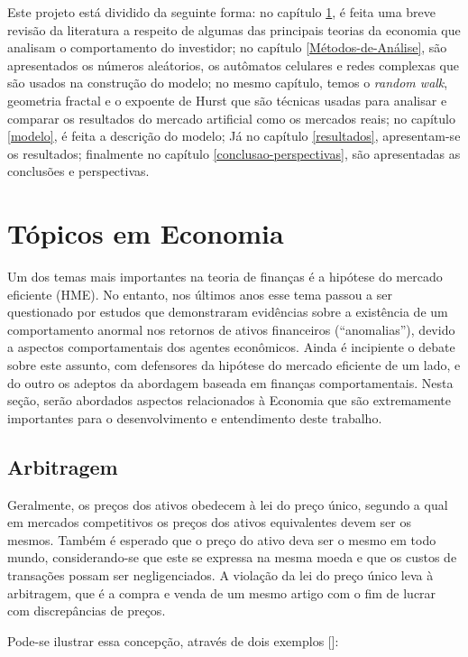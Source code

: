\documentclass[brazil,ruledheader]{abnt}
\renewcommand{\cite}[1]{[\citeonline{#1}]}
\begin{document}
Este projeto está dividido da seguinte forma: no capítulo
\ref{topicos-em-economia}, é feita uma breve revisão da literatura a respeito de
algumas das principais teorias da economia que analisam o comportamento do
investidor; no capítulo \ref{Métodos-de-Análise}, são apresentados os números
aleátorios, os autômatos celulares e redes complexas que são usados na
construção do modelo; no mesmo capítulo, temos o \emph{random walk}, geometria
fractal e o expoente de Hurst  que são técnicas usadas para analisar e comparar
os
resultados do mercado artificial como os mercados reais; no capítulo
\ref{modelo}, é feita a descrição do modelo; Já no capítulo \ref{resultados},
apresentam-se os resultados; finalmente no capítulo
\ref{conclusao-perspectivas}, são apresentadas as conclusões e perspectivas.   


\chapter{Tópicos em Economia}\label{topicos-em-economia}

Um dos temas mais importantes na teoria de finanças é a hipótese do mercado
eficiente (HME). No entanto, nos últimos anos esse tema passou a ser
questionado por
estudos que demonstraram evidências sobre a existência de um comportamento
anormal nos retornos de ativos financeiros (``anomalias''), devido a
aspectos comportamentais dos agentes econômicos. Ainda é incipiente o
debate sobre este assunto, com defensores da hipótese do
mercado eficiente de um lado, e do outro os adeptos da abordagem baseada em
finanças
comportamentais.
Nesta seção, serão  abordados aspectos relacionados à 
Economia que são extremamente importantes para o desenvolvimento e
entendimento deste trabalho.

\section{Arbitragem}

Geralmente, os preços dos ativos obedecem à lei do preço único, segundo a qual
em mercados competitivos os preços dos ativos equivalentes devem ser os
mesmos. Também é esperado que o preço do ativo deva ser o mesmo em todo
mundo, considerando-se que este se expressa na mesma moeda e que os custos de 
transações possam ser negligenciados. A violação da lei do preço único leva
à arbitragem, que é a compra e venda de um mesmo artigo com o fim de lucrar
com discrepâncias de preços.

Pode-se ilustrar essa concepção, através de dois
exemplos \cite{MaSt00}:
\end{document}
